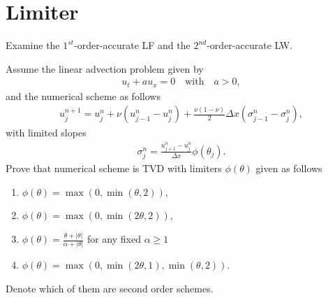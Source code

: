 \documentclass[12pt]{article}
\begin{document}
\clearpage
\section{Limiter}
\begin{example}
	Examine the $1^{st}$-order-accurate LF and the $2^{nd}$-order-accurate LW.
\end{example}

\pagebreak
\begin{example}
	Assume the linear advection problem given by
	\begin{align*}
		u_t + au_x = 0
		\quad\text{with}\quad
		a>0,
	\end{align*}
	and the numerical scheme as follows
	\begin{align*}
		u_j^{n+1}
		= u_j^n + \nu \left(u_{j-1}^n-u_j^n \right)
		+ \frac{\nu(1-\nu)}{2}\Delta x \left(\sigma_{j-1}^n - \sigma_j^n \right),
	\end{align*}
	with limited slopes
	\begin{align*}
		\sigma_j^n = \frac{u_{j+1}^n-u_j^n}{\Delta x}\phi(\theta_j).
	\end{align*}
	Prove that numerical scheme is TVD with limiters $\phi(\theta)$ given as follows
	\begin{enumerate}
		\item $\displaystyle \phi(\theta) = \max(0, \min(\theta, 2))$,
		\item $\displaystyle \phi(\theta) = \max(0, \min(2\theta, 2))$,
		\item $\displaystyle \phi(\theta) = \frac{\theta + |\theta|}{\alpha+|\theta|}$ for
		      any fixed $\alpha \ge 1$
		\item $\displaystyle \phi(\theta) = \max(0, \min(2\theta, 1), \min(\theta, 2))$.
	\end{enumerate}
	Denote which of them are second order schemes.
\end{example}
\end{document}
